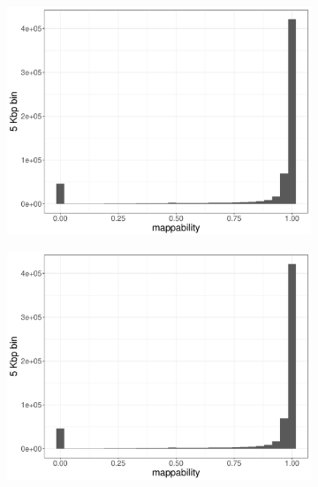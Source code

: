 \begin{figure}[htp]
  \centering
  \begin{subfigure}[b]{.48\textwidth}
    \includegraphics[width=\linewidth,page=2]{figures/wgs-map-coverage-cohorts.pdf}
    \caption{}
    \label{fig:mapcov}
  \end{subfigure}
  \begin{subfigure}[b]{.48\textwidth}
    \includegraphics[width=\linewidth,page=3]{figures/wgs-map-coverage-cohorts.pdf}
    \caption{}
    \label{fig:meancov}
  \end{subfigure}


\end{figure}

